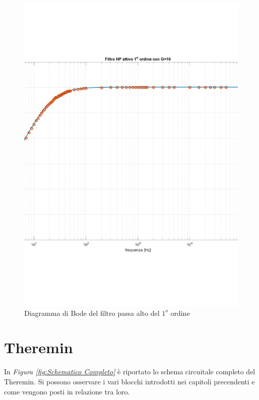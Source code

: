 \documentclass[titlepage]{report}
\begin{document}
	\begin{figure}[H]
		\centering
		\includegraphics[scale=0.7]{Immagini/hpf1_psea.pdf}
		\caption{Diagramma di Bode del filtro passa alto del $1^o$ ordine}
		\label{fig:BODEHp1Real}
	\end{figure}


\newpage
\section{Theremin}
\label{ch:Teremin}

	In \textit{Figura \ref{fig:Schematico Completo}} è riportato lo schema circuitale completo del Theremin. Si possono osservare i vari blocchi introdotti nei capitoli precendenti e come vengono posti in relazione tra loro.
\end{document}
